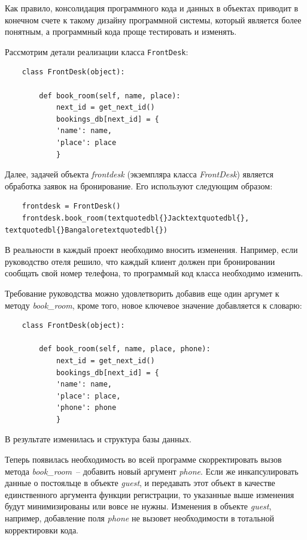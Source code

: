 \documentclass[a4paper,openany,twoside,final]{book}
\providecommand*{\DUroletitlereference}[1]{\textsl{#1}}
\begin{document}
Как правило, консолидация программного кода и данных в объектах приводит в конечном счете к такому дизайну программной системы, который является более понятным, а программный кода проще тестировать и изменять.

Рассмотрим детали реализации класса \texttt{FrontDesk}:

\begin{verbatim}
    class FrontDesk(object):

        def book_room(self, name, place):
            next_id = get_next_id()
            bookings_db[next_id] = {
            'name': name,
            'place': place
            }
\end{verbatim}

Далее, задачей объекта \DUroletitlereference{frontdesk} (экземпляра класса \DUroletitlereference{FrontDesk}) является обработка заявок на бронирование.  Его используют следующим образом:

\begin{verbatim}
    frontdesk = FrontDesk()
    frontdesk.book_room(textquotedbl{}Jacktextquotedbl{}, textquotedbl{}Bangaloretextquotedbl{})
\end{verbatim}

В реальности в каждый проект необходимо вносить изменения.  Например, если руководство отеля решило, что каждый клиент должен при бронировании сообщать свой номер телефона, то программый код класса необходимо изменить.

Требование руководства можно удовлетворить добавив еще один аргумет к методу \DUroletitlereference{book\_room}, кроме того, новое ключевое значение добавляется к словарю:

\begin{verbatim}
    class FrontDesk(object):

        def book_room(self, name, place, phone):
            next_id = get_next_id()
            bookings_db[next_id] = {
            'name': name,
            'place': place,
            'phone': phone
            }
\end{verbatim}

В результате изменилась и структура базы данных.

Теперь появилась необходимость во всей программе скорректировать вызов метода \DUroletitlereference{book\_room}~-- добавить новый аргумент \DUroletitlereference{phone}.  Если же инкапсулировать данные о постояльце в объекте \DUroletitlereference{guest}, и передавать этот объект в качестве единственного аргумента функции регистрации, то указанные выше изменения будут минимизированы или вовсе не нужны.  Изменения в объекте \DUroletitlereference{guest}, например, добавление поля \DUroletitlereference{phone} не вызовет необходимости в тотальной корректировки кода.
\end{document}
